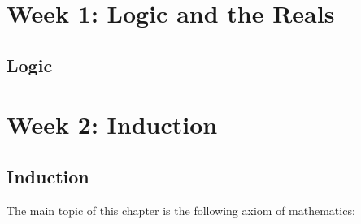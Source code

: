 \documentclass[11pt,dvipsnames]{book}
\numberwithin{equation}{section} %
\numberwithin{figure}{section} %
\numberwithin{table}{section} %
\begin{document}




\pagestyle{empty} %

 \tableofcontents %

\cleardoublepage %

\pagestyle{fancy} %




\part{Week 1: Logic and the Reals}





\chapter{Logic}

\setcounter{page}{1}






\part{Week 2: Induction}





\chapter{Induction}

\setcounter{page}{1}
The main topic of this chapter is the following axiom of mathematics:
\end{document}
